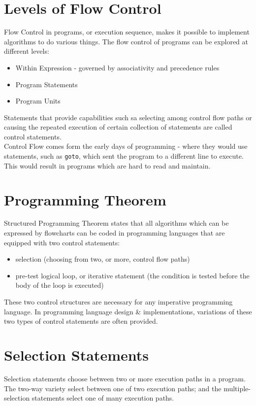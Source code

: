 
\section{Levels of Flow Control}
Flow Control in programs, or execution sequence, makes it possible to implement algorithms to do various things. The flow control of programs can be explored at different levels:
\begin{itemize}
    \item Within Expression - governed by associativity and precedence rules
    \item Program Statements
    \item Program Units
\end{itemize}

Statements that provide capabilities such sa selecting among control flow paths or causing the repeated execution of certain collection of statements are called control statements.\\

Control Flow comes form the early days of programming - where they would use statements, such as \verb|goto|, which sent the program to a different line to execute. This would result in programs which are hard to read and maintain. 

\section{Programming Theorem}
Structured Programming Theorem states that all algorithms which can be expressed by flowcharts can be coded in programming languages that are equipped with two control statements:
\begin{itemize}
    \item selection (choosing from two, or more, control flow paths)
    \item pre-test logical loop, or iterative statement (the condition is tested before the body of the loop is executed)
\end{itemize}

These two control structures are necessary for any imperative programming language. In programming language design \& implementations, variations of these two types of control statements are often provided. 

\section{Selection Statements}
Selection statements choose between two or more execution paths in a program. The two-way variety select between one of two execution paths; and the multiple-selection statements select one of many execution paths.

